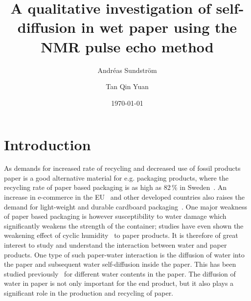 \documentclass[11pt,a4paper, twocolumn,
swedish, english %
]{article}
\begin{document}


\title{A qualitative investigation of self-diffusion in wet
  paper using the NMR pulse echo method} 
\author{Andréas Sundström \and Tan Qin Yuan}
\date{\today}


\twocolumn[
\begin{@twocolumnfalse}
\maketitle
\begin{abstract}
\end{abstract}
\rule{\linewidth}{0.5pt}
\end{@twocolumnfalse}
]




\section{Introduction}

As demands for increased rate of recycling and decreased use of fossil
products paper is a good alternative material for e.g. packaging
products, where the recycling rate of paper based packaging is as high
as 82\,\% in Sweden~\cite{Adolfson_NVV2016}. An increase in e-commerce
in the EU~\cite{eurostat_e-commerce2017} and other developed countries
also raises the demand for light-weight and durable cardboard
packaging~\cite{Nordstrand2003}. One major weakness of paper based 
packaging is however susceptibility to water damage which
significantly weakens the strength of the container; studies have even
shown the weakening effect of cyclic
humidity~\cite{Sorensen-Hoffmann2004} to paper products. It is 
therefore of great interest to study and understand the interaction
between water and paper products. 
One type of such paper-water interaction is the diffusion of water
into the paper and subsequent water self-diffusion inside the 
paper. This has been studied previously~\cite{Perkins-Batchelor2012,
  Li-etal1992, Topgaard-Soderman2001} for different water contents in
the paper. The diffusion of water in paper is not only important for
the end product, but it also plays a significant role in the
production and recycling of paper.
\end{document}
